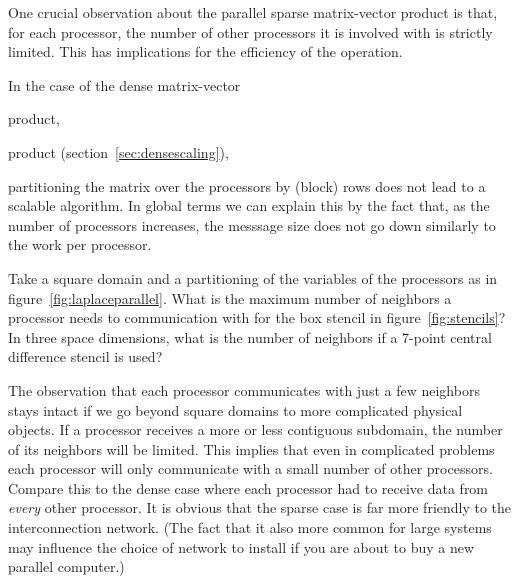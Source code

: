 One crucial observation about the parallel sparse matrix-vector
product
is that, for each processor, the number of
other processors it is involved with is strictly limited. This has
implications for the efficiency of the operation.

In the case of the dense matrix-vector 
\begin{packt}
  product,
\end{packt}
\begin{nopackt}
  product (section~\ref{sec:densescaling}),
\end{nopackt}
partitioning the matrix over the
processors by (block) rows does not lead to a scalable algorithm.
In global terms we can explain this by the fact that,
as the number of processors increases,
the messsage size does not go down similarly to the work per processor.

\begin{nopackt}
\begin{exercise}
    Take a square domain and a partitioning of the variables of the
    processors as in figure~\ref{fig:laplaceparallel}.
    What is the maximum number of neighbors a
    processor needs to communication with for the box stencil in
    figure~\ref{fig:stencils}? In three space dimensions, what is the
    number of neighbors if a 7-point central difference stencil is
    used?
\end{exercise}
\end{nopackt}

The observation that each processor communicates with just a few
neighbors stays intact if we go beyond square domains to more
complicated physical objects. If a processor receives a more or less
contiguous subdomain, the number of its neighbors will be
limited. This implies that even in complicated problems each processor
will only communicate with a small number of other processors. Compare
this to the dense case where each processor had to receive data from
\emph{every} other processor. It is obvious that the sparse case is
far more friendly to the interconnection network. (The fact that it
also more common for large systems may influence the choice of network
to install if you are about to buy a new parallel computer.)


